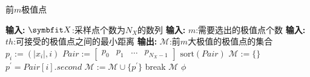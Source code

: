 {	
	\begin{breakablealgorithm}
		\caption{前$m$极值点}\label{alg:maxpoint}
		\begin{algorithmic}[1]
			\Statex \textbf{输入:} $\Vector X$:采样点个数为$N_X$的数列
			\Statex \textbf{输入:} $m$:需要选出的极值点个数
			\Statex \textbf{输入:} $th$:可接受的极值点之间的最小距离
			\Statex \textbf{输出:} $\mathcal M$:前$m$大极值的极值点的集合
			\State $p_i:=(\vert x_i\vert,i)$
			\EndFor
			\State $Pair:=\begin{bmatrix}p_0&p_1&\ldots&p_{N_X-1}\end{bmatrix}$
			\State $\mathrm{sort}(Pair)$
			\State $\mathcal M:=\{\}$
			\State $p^\prime=Pair[i].second$
			\State $\mathcal M:=\mathcal M\cup\{p^\prime\}$
			\State break
			\EndIf
			\EndIf
			\EndFor
			\State \Return $\mathcal M$
			\Else
			\State \Return $\phi$
			\EndIf
		\end{algorithmic}
	\end{breakablealgorithm}
}